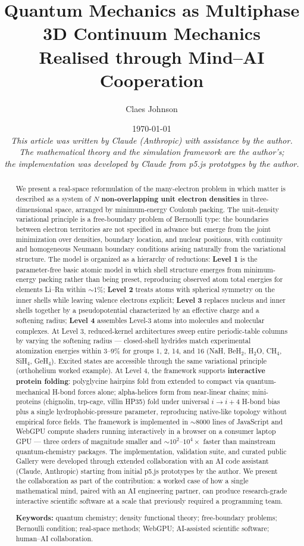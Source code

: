 \documentclass[11pt]{article}
\title{Quantum Mechanics as Multiphase 3D Continuum Mechanics \\[0.2em]
\large Realised through Mind--AI Cooperation}
\author[1]{Claes Johnson}
\affil[1]{KTH Royal Institute of Technology, Stockholm, Sweden \\
\texttt{claesjohnson@gmail.com}}
\date{\today \\[0.5em]
\textit{This article was written by Claude (Anthropic) with assistance by the author.} \\
\textit{The mathematical theory and the simulation framework are the author's;} \\
\textit{the implementation was developed by Claude from p5.js prototypes by the author.}}
\begin{document}
\maketitle

\begin{abstract}
We present a real-space reformulation of the many-electron problem in which matter is described as a system of $N$ \textbf{non-overlapping unit electron densities} in three-dimensional space, arranged by minimum-energy Coulomb packing. The unit-density variational principle is a free-boundary problem of Bernoulli type: the boundaries between electron territories are not specified in advance but emerge from the joint minimization over densities, boundary location, and nuclear positions, with continuity and homogeneous Neumann boundary conditions arising naturally from the variational structure. The model is organized as a hierarchy of reductions: \textbf{Level 1} is the parameter-free basic atomic model in which shell structure emerges from minimum-energy packing rather than being preset, reproducing observed atom total energies for elements Li--Rn within ${\sim}1\%$; \textbf{Level 2} treats atoms with spherical symmetry on the inner shells while leaving valence electrons explicit; \textbf{Level 3} replaces nucleus and inner shells together by a pseudopotential characterized by an effective charge and a softening radius; \textbf{Level 4} assembles Level-3 atoms into molecules and molecular complexes. At Level 3, reduced-kernel architectures sweep entire periodic-table columns by varying the softening radius --- closed-shell hydrides match experimental atomization energies within 3--9\% for groups 1, 2, 14, and 16 (NaH, BeH$_2$, H$_2$O, CH$_4$, SiH$_4$, GeH$_4$). Excited states are accessible through the same variational principle (orthohelium worked example). At Level 4, the framework supports \textbf{interactive protein folding}: polyglycine hairpins fold from extended to compact via quantum-mechanical H-bond forces alone; alpha-helices form from near-linear chains; mini-proteins (chignolin, trp-cage, villin HP35) fold under universal $i \to i{+}4$ H-bond bias plus a single hydrophobic-pressure parameter, reproducing native-like topology without empirical force fields. The framework is implemented in ${\sim}8000$ lines of JavaScript and WebGPU compute shaders running interactively in a browser on a consumer laptop GPU --- three orders of magnitude smaller and ${\sim}10^2$--$10^4 \times$ faster than mainstream quantum-chemistry packages. The implementation, validation suite, and curated public Gallery were developed through extended collaboration with an AI code assistant (Claude, Anthropic) starting from initial p5.js prototypes by the author. We present the collaboration as part of the contribution: a worked case of how a single mathematical mind, paired with an AI engineering partner, can produce research-grade interactive scientific software at a scale that previously required a programming team.

\medskip
\noindent \textbf{Keywords:} quantum chemistry; density functional theory; free-boundary problems; Bernoulli condition; real-space methods; WebGPU; AI-assisted scientific software; human--AI collaboration.
\end{abstract}
\end{document}
